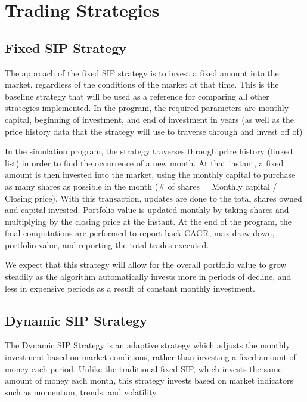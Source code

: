 \documentclass[12pt]{article}
\begin{document}
\section{Trading Strategies}
\subsection{Fixed SIP Strategy}
The approach of the fixed SIP strategy is to invest a fixed amount into the market, regardless of the conditions of the market at that time. This is the baseline strategy that will be used as a reference for comparing all other strategies implemented. In the program, the required parameters are monthly capital, beginning of investment, and end of investment in years (as well as the price history data that the strategy will use to traverse through and invest off of)

In the simulation program, the strategy traverses through price history (linked list) in order to find the occurrence of a new month. At that instant, a fixed amount is then invested into the market, using the monthly capital to purchase as many shares as possible in the month (\# of shares = Monthly capital / Closing price). With this transaction, updates are done to the total shares owned and capital invested. Portfolio value is updated monthly by taking shares and multiplying by the closing price at the instant. At the end of the program, the final computations are performed to report back CAGR, max draw down, portfolio value, and reporting the total trades executed. 

We expect that this strategy will allow for the overall portfolio value to grow steadily as the algorithm automatically invests more in periods of decline, and less in expensive periods as a result of constant monthly investment. 
\subsection{Dynamic SIP Strategy}
The Dynamic SIP Strategy is an adaptive strategy which adjusts the monthly investment based on market conditions, rather than investing a fixed amount of money each period. Unlike the traditional fixed SIP, which invests the same amount of money each month, this strategy invests based on market indicators such as momentum, trends, and volatility. 
\end{document}
